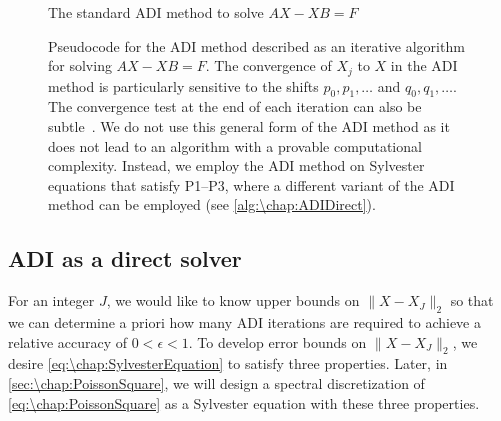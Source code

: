 \begin{figure}
\begin{algorithm}[H]
\caption{The standard ADI method to solve $AX-XB = F$}
\begin{algorithmic}[1]
\Do
{}
\end{algorithmic}
\label{alg:\chap:ADI}
\end{algorithm}
\vspace{-1.5em}
\caption{Pseudocode for the ADI method described as an iterative algorithm for solving $AX-XB = F$. The convergence of $X_j$ to $X$ in the ADI method is particularly sensitive to the shifts $p_0,p_1,\ldots$ and $q_0,q_1,\ldots$. The convergence test at the end of each iteration can also be subtle~\cite[Sec.~2.2]{Sabino_07_01}. We do not use this general form of the ADI method as it does not lead to an algorithm with a provable computational complexity. Instead, we employ the ADI method on Sylvester equations that satisfy P1--P3, where a different variant of the ADI method can be employed (see \cref{alg:\chap:ADIDirect}).}
\label{fig:\chap:ADI}
\end{figure}

\subsection{ADI as a direct solver}
For an integer $J$, we would like to know upper bounds on $\|X-X_J\|_2$ so that we can determine a priori how many ADI iterations are required to achieve a relative accuracy of $0<\epsilon<1$. To develop error bounds on $\|X-X_J\|_2$, we desire \cref{eq:\chap:SylvesterEquation} to satisfy three properties.  Later, in \cref{sec:\chap:PoissonSquare}, we will design a spectral discretization of \cref{eq:\chap:PoissonSquare} as a Sylvester equation with these three properties.

